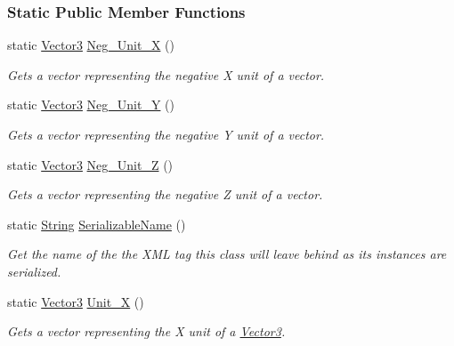 \subsubsection*{Static Public Member Functions}
\begin{DoxyCompactItemize}
\item 
static \hyperlink{classphys_1_1Vector3}{Vector3} \hyperlink{classphys_1_1Vector3_aa94ab8ce5d5cab51a4c2ef1e78430731}{Neg\_\-Unit\_\-X} ()
\begin{DoxyCompactList}\small\item\em Gets a vector representing the negative X unit of a vector. \item\end{DoxyCompactList}\item 
static \hyperlink{classphys_1_1Vector3}{Vector3} \hyperlink{classphys_1_1Vector3_a0ac8b5f2e0d28de9294502c1e4391b8c}{Neg\_\-Unit\_\-Y} ()
\begin{DoxyCompactList}\small\item\em Gets a vector representing the negative Y unit of a vector. \item\end{DoxyCompactList}\item 
static \hyperlink{classphys_1_1Vector3}{Vector3} \hyperlink{classphys_1_1Vector3_a2e5bc13758eaa6a45ae45fbb9df0c732}{Neg\_\-Unit\_\-Z} ()
\begin{DoxyCompactList}\small\item\em Gets a vector representing the negative Z unit of a vector. \item\end{DoxyCompactList}\item 
static \hyperlink{namespacephys_aa03900411993de7fbfec4789bc1d392e}{String} \hyperlink{classphys_1_1Vector3_aa0ef74eaaaa3c03fffdae6580cb079f4}{SerializableName} ()
\begin{DoxyCompactList}\small\item\em Get the name of the the XML tag this class will leave behind as its instances are serialized. \item\end{DoxyCompactList}\item 
static \hyperlink{classphys_1_1Vector3}{Vector3} \hyperlink{classphys_1_1Vector3_aa2f573233982cb27cb05e5bfe38b327e}{Unit\_\-X} ()
\begin{DoxyCompactList}\small\item\em Gets a vector representing the X unit of a \hyperlink{classphys_1_1Vector3}{Vector3}. \item\end{DoxyCompactList}\item 

\end{DoxyCompactItemize}
